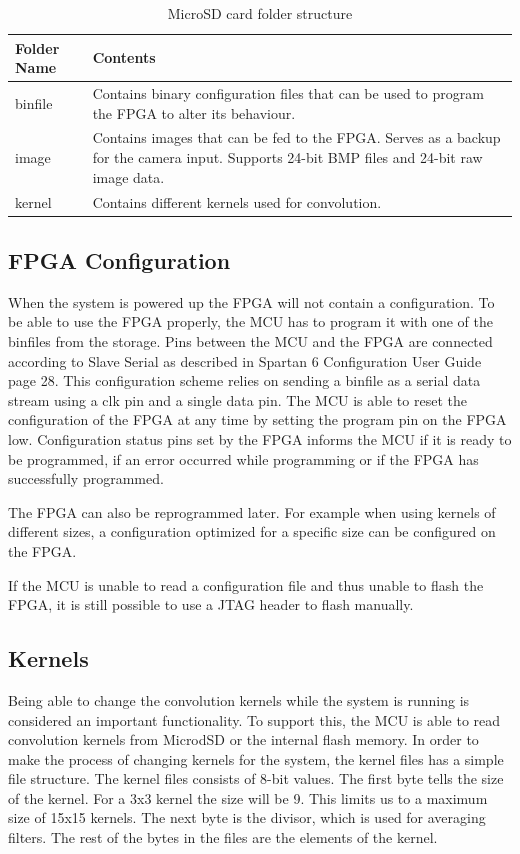 \begin{table}[h!]
\centering
	\begin{tabular}{ | l | p{10cm} |}
		\hline
		Folder Name & Contents \\ \hline
		binfile & Contains binary configuration files that can be used to program the FPGA to alter its behaviour. \\ \hline
		image & Contains images that can be fed to the FPGA. Serves as a backup for the camera input. Supports 24-bit BMP files and 24-bit raw image data. \\ \hline
		kernel & Contains different kernels used for convolution. \\ \hline
	\end{tabular}
	\caption{MicroSD card folder structure}
	\label{microsd_folder}
\end{table}


\subsection{FPGA Configuration}
When the system is powered up the FPGA will not contain a configuration. To be able to use the FPGA properly, the MCU has to program it with one of the binfiles from the storage. Pins between the MCU and the FPGA are connected according to Slave Serial as described in Spartan 6 Configuration User Guide\cite{ug380} page 28. This configuration scheme relies on sending a binfile as a serial data stream using a clk pin and a single data pin. The MCU is able to reset the configuration of the FPGA at any time by setting the program pin on the FPGA low. Configuration status pins set by the FPGA informs the MCU if it is ready to be programmed, if an error occurred while programming or if the FPGA has successfully programmed.

The FPGA can also be reprogrammed later. For example when using kernels of different sizes, a configuration optimized for a specific size can be configured on the FPGA.

If the MCU is unable to read a configuration file and thus unable to flash the FPGA, it is still possible to use a JTAG header to flash manually.  

\subsection{Kernels}
Being able to change the convolution kernels while the system is running is considered an important functionality. To support this, the MCU is able to read convolution kernels from MicrodSD or the internal flash memory. 
In order to make the process of changing kernels for the system, the kernel files has a simple file structure. The kernel files consists of 8-bit values. The first byte tells the size of the kernel. For a 3x3 kernel the size will be 9. This limits us to a maximum size of 15x15 kernels. The next byte is the divisor, which is used for averaging filters. The rest of the bytes in the files are the elements of the kernel.

